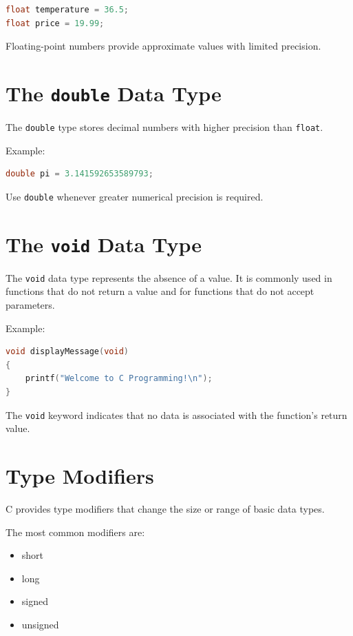 \documentclass[12pt,openany]{book}
\begin{document}
\begin{lstlisting}[language=C]
float temperature = 36.5;
float price = 19.99;
\end{lstlisting}

Floating-point numbers provide approximate values with limited precision.

\section{The \texttt{double} Data Type}

The \texttt{double} type stores decimal numbers with higher precision than \texttt{float}.

Example:

\begin{lstlisting}[language=C]
double pi = 3.141592653589793;
\end{lstlisting}

Use \texttt{double} whenever greater numerical precision is required.
\section{The \texttt{void} Data Type}

The \texttt{void} data type represents the absence of a value. It is commonly used in functions that do not return a value and for functions that do not accept parameters.

Example:

\begin{lstlisting}[language=C]
void displayMessage(void)
{
    printf("Welcome to C Programming!\n");
}
\end{lstlisting}

The \texttt{void} keyword indicates that no data is associated with the function's return value.

\section{Type Modifiers}

C provides type modifiers that change the size or range of basic data types.

The most common modifiers are:

\begin{itemize}
    \item short
    \item long
    \item signed
    \item unsigned
\end{itemize}
\end{document}
